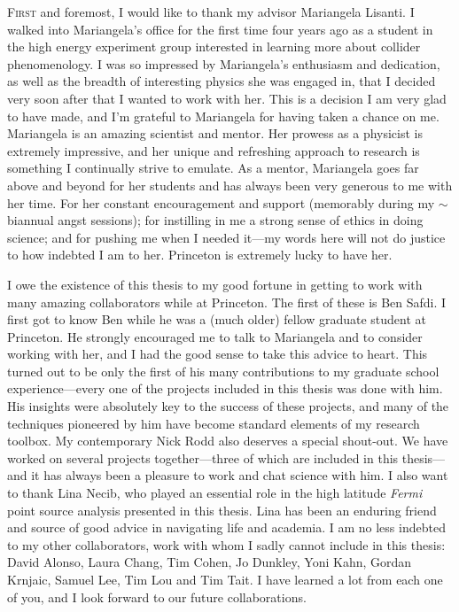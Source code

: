 


\lettrine[lines=3]{F}{irst} and foremost, I would like to thank my advisor Mariangela Lisanti. I walked into Mariangela's office for the first time four years ago as a student in the high energy experiment group interested in learning more about collider phenomenology. I was so impressed by Mariangela's enthusiasm and dedication, as well as the breadth of interesting physics she was engaged in, that I decided very soon after that I wanted to work with her. This is a decision I am very glad to have made, and I'm grateful to Mariangela for having taken a chance on me. Mariangela is an amazing scientist and mentor. Her prowess as a physicist is extremely impressive, and her unique and refreshing approach to research is something I continually strive to emulate. As a mentor, Mariangela goes far above and beyond for her students and has always been very generous to me with her time. For her constant encouragement and support (memorably during my $\sim$biannual angst sessions); for instilling in me a strong sense of ethics in doing science; and for pushing me when I needed it---my words here will not do justice to how indebted I am to her. Princeton is extremely lucky to have her.

I owe the existence of this thesis to my good fortune in getting to work with many amazing collaborators while at Princeton. The first of these is Ben Safdi. I first got to know Ben while he was a (much older) fellow graduate student at Princeton. He strongly encouraged me to talk to Mariangela and to consider working with her, and I had the good sense to take this advice to heart. This turned out to be only the first of his many contributions to my graduate school experience---every one of the projects included in this thesis was done with him. His insights were absolutely key to the success of these projects, and many of the techniques pioneered by him have become standard elements of my research toolbox. My contemporary Nick Rodd also deserves a special shout-out. We have worked on several projects together---three of which are included in this thesis---and it has always been a pleasure to work and chat science with him. I also want to thank Lina Necib, who played an essential role in the high latitude \emph{Fermi} point source analysis presented in this thesis. Lina has been an enduring friend and source of good advice in navigating life and academia. I am no less indebted to my other collaborators, work with whom I sadly cannot include in this thesis: David Alonso, Laura Chang, Tim Cohen, Jo Dunkley, Yoni Kahn, Gordan Krnjaic, Samuel Lee, Tim Lou and Tim Tait. I have learned a lot from each one of you, and I look forward to our future collaborations. 

